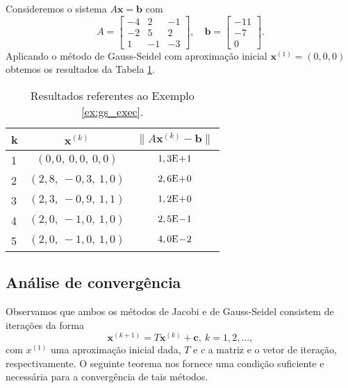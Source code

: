 \begin{ex}\label{ex:gs_exec}
  Consideremos o sistema $A\pmb{x} = \pmb{b}$ com
  \begin{equation}
    A =
    \begin{bmatrix}
      -4 & 2 & -1 \\
      -2 & 5 & 2 \\
       1 & -1 & -3
    \end{bmatrix},\quad
    \pmb{b} =
    \begin{bmatrix}
      -11\\ -7\\ 0
    \end{bmatrix}.
  \end{equation}
  Aplicando o método de Gauss-Seidel com aproximação inicial $\pmb{x}^{(1)} = (0, 0, 0)$ obtemos os resultados da Tabela \ref{tab:ex_gs_exec}.

  \begin{table}[h!]
    \centering
    \begin{tabular}{l|cc}
      k & $\pmb{x}^{(k)}$ & $\|A\pmb{x}^{(k)}-\pmb{b}\|$\\\hline
      1 & $(0,0,~0,0,~0,0)$ & $1,3\mathrm{E}\!+\!1$ \\
      2 & $(2,8,~-0,3,~1,0)$ & $2,6\mathrm{E}\!+\!0$ \\
      3 & $(2,3,~-0,9,~1,1)$ & $1,2\mathrm{E}\!+\!0$ \\
      4 & $(2,0,~-1,0,~1,0)$ & $2,5\mathrm{E}\!-\!1$ \\
      5 & $(2,0,~-1,0,~1,0)$ & $4,0\mathrm{E}\!-\!2$ \\\hline
    \end{tabular}
    \caption{Resultados referentes ao Exemplo \ref{ex:gs_exec}.}
    \label{tab:ex_gs_exec}
  \end{table}

% 
\end{ex}

\subsection{Análise de convergência}

Observamos que ambos os métodos de Jacobi e de Gauss-Seidel consistem de iterações da forma
\begin{equation}
  \pmb{x}^{(k+1)} = T\pmb{x}^{(k)} + \pmb{c},~k=1, 2, \ldots,\label{eq:jgs_iter}
\end{equation}
com $x^{(1)}$ uma aproximação inicial dada, $T$ e $c$ a matriz e o vetor de iteração, respectivamente. O seguinte teorema nos fornece uma condição suficiente e necessária para a convergência de tais métodos.

